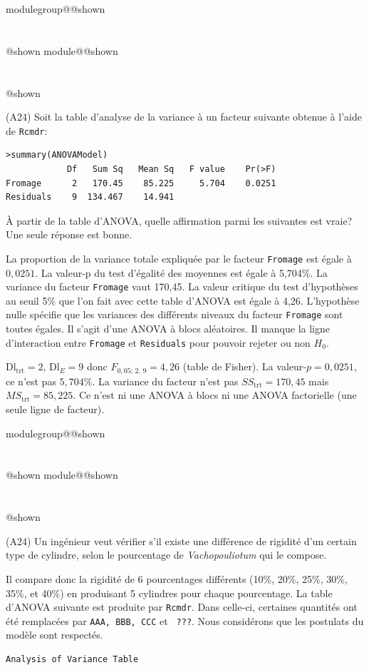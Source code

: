 \documentclass{Evaluation}
\makeatletter
\newcommand{\currentmodulekey}{}
\newcommand{\currentmoduletitle}{}
\newcommand{\currentgroupkey}{}
\newcommand{\currentgrouptitle}{}
\newcommand{\showmoduleifneeded}{%
  \ifx\currentgroupkey\empty\else
    \expandafter\ifx\csname modulegroup@\currentgroupkey @shown\endcsname\relax
      \section*{\currentgrouptitle}%
      \expandafter\gdef\csname modulegroup@\currentgroupkey @shown\endcsname{1}%
    \fi
  \fi
  \expandafter\ifx\csname module@\currentmodulekey @shown\endcsname\relax
    \section*{\currentmoduletitle}%
    \expandafter\gdef\csname module@\currentmodulekey @shown\endcsname{1}%
  \fi
}
\newenvironment{A24}{\showmoduleifneeded}{}
\makeatother
\begin{document}
\begin{questions}
\begin{A24}
\question (A24) Soit la table d'analyse de la variance à un facteur suivante obtenue à l'aide de \texttt{Rcmdr}:
\begin{verbatim}
>summary(ANOVAModel)
            Df   Sum Sq   Mean Sq   F value    Pr(>F)    
Fromage      2   170.45    85.225     5.704    0.0251
Residuals    9  134.467    14.941                      
\end{verbatim}

À partir de la table d'ANOVA, quelle affirmation parmi les suivantes est vraie? Une seule réponse est bonne.

\begin{checkboxes}
\choice La proportion de la variance totale expliquée par le facteur \texttt{Fromage} est égale à $0,0251$. 
\choice La valeur-p du test d'égalité des moyennes est égale à 5,704\%.
\choice La variance du facteur \texttt{Fromage} vaut 170,45.
\correctchoice La valeur critique du test d'hypothèses au seuil 5\% que l'on fait avec cette table d'ANOVA est égale à 4,26.
\choice L'hypothèse nulle spécifie que les variances des différents niveaux du facteur \texttt{Fromage} sont toutes égales.
\choice Il s'agit d'une ANOVA à blocs aléatoires.
\choice Il manque la ligne d'interaction entre \texttt{Fromage} et \texttt{Residuals} pour pouvoir rejeter ou non $H_0$. 
\end{checkboxes}

\begin{solution}
$\text{Dl}_{\text{trt}}=2$, $\text{Dl}_E=9$ donc $F_{0{,}05;\,2,\,9} = 4{,}26$ (table de Fisher). La valeur-$p = 0{,}0251$, ce n'est pas $5{,}704\%$. La variance du facteur n'est pas $SS_{\text{trt}} = 170{,}45$ mais $MS_{\text{trt}} = 85{,}225$. Ce n'est ni une ANOVA à blocs ni une ANOVA factorielle (une seule ligne de facteur).
\end{solution}
\end{A24}

\begin{A24}
\question (A24)
Un ingénieur veut vérifier s'il existe une différence de rigidité d'un certain type de cylindre, selon le pourcentage de \textit{Vachopouliotum} qui le compose.

Il compare donc la rigidité de 6 pourcentages différents (10\%, 20\%, 25\%, 30\%, 35\%, et 40\%) en produisant 5 cylindres pour chaque pourcentage.
La table d'ANOVA suivante est produite par \texttt{Rcmdr}. 
Dans celle-ci, certaines quantités ont été remplacées par \texttt{AAA, BBB, CCC} et \texttt{ ???}. Nous considérons que les postulats du modèle sont respectés.
\begin{verbatim}
Analysis of Variance Table


\end{verbatim}
\end{A24}
\end{questions}
\end{document}

